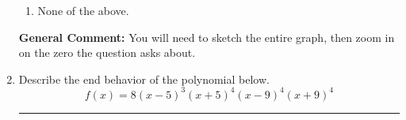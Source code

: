 \documentclass{extbook}[14pt]
\newcommand{\litem}[1]{\item #1

\rule{\textwidth}{0.4pt}}
\begin{document}
\begin{enumerate}
{\begin{enumerate}[label=\Alph*.]
\item None of the above.\end{enumerate}
\textbf{General Comment:} You will need to sketch the entire graph, then zoom in on the zero the question asks about.
}
\litem{
Describe the end behavior of the polynomial below.
\[ f(x) = 8(x - 5)^{3}(x + 5)^{4}(x - 9)^{4}(x + 9)^{4} \]

}
\end{enumerate}
\end{document}
